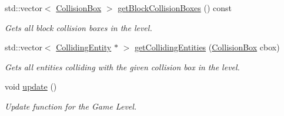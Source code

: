 \begin{DoxyCompactItemize}
\mbox{\label{class_game_level_acff2a3ef4d7ca6b608b1f1e1ff8fa559}} 
std\+::vector$<$ \mbox{\hyperlink{class_collision_box}{Collision\+Box}} $>$ \mbox{\hyperlink{class_game_level_acff2a3ef4d7ca6b608b1f1e1ff8fa559}{get\+Block\+Collision\+Boxes}} () const
\begin{DoxyCompactList}\small\item\em Gets all block collision boxes in the level. \end{DoxyCompactList}\item 
std\+::vector$<$ \mbox{\hyperlink{class_colliding_entity}{Colliding\+Entity}} $\ast$ $>$ \mbox{\hyperlink{class_game_level_aa3342e1923f751cdcb9bc9795f27ea33}{get\+Colliding\+Entities}} (\mbox{\hyperlink{class_collision_box}{Collision\+Box}} cbox)
\begin{DoxyCompactList}\small\item\em Gets all entities colliding with the given collision box in the level. \end{DoxyCompactList}\item 
void \mbox{\hyperlink{class_game_level_ab5570d8406f71f4439a1bda0e7d99efa}{update}} ()
\begin{DoxyCompactList}\small\item\em Update function for the Game Level. \end{DoxyCompactList}\end{DoxyCompactItemize}
